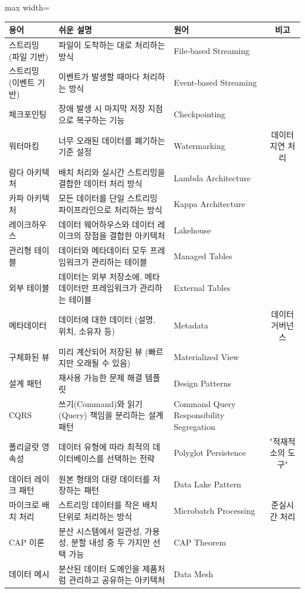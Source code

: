 \documentclass[11pt,a4paper]{article}
\theoremstyle{definition}
\begin{document}
\begin{adjustbox}{max width=\textwidth}
\begin{tabular}{lllc}
\toprule
\textbf{용어} & \textbf{쉬운 설명} & \textbf{원어} & \textbf{비고} \\
\midrule
스트리밍 (파일 기반) & 파일이 도착하는 대로 처리하는 방식 & File-based Streaming & \\
스트리밍 (이벤트 기반) & 이벤트가 발생할 때마다 처리하는 방식 & Event-based Streaming & \\
체크포인팅 & 장애 발생 시 마지막 저장 지점으로 복구하는 기능 & Checkpointing & \\
워터마킹 & 너무 오래된 데이터를 폐기하는 기준 설정 & Watermarking & 데이터 지연 처리 \\
람다 아키텍처 & 배치 처리와 실시간 스트리밍을 결합한 데이터 처리 방식 & Lambda Architecture & \\
카파 아키텍처 & 모든 데이터를 단일 스트리밍 파이프라인으로 처리하는 방식 & Kappa Architecture & \\
레이크하우스 & 데이터 웨어하우스와 데이터 레이크의 장점을 결합한 아키텍처 & Lakehouse & \\
관리형 테이블 & 데이터와 메타데이터 모두 프레임워크가 관리하는 테이블 & Managed Tables & \\
외부 테이블 & 데이터는 외부 저장소에, 메타데이터만 프레임워크가 관리하는 테이블 & External Tables & \\
메타데이터 & 데이터에 대한 데이터 (설명, 위치, 소유자 등) & Metadata & 데이터 거버넌스 \\
구체화된 뷰 & 미리 계산되어 저장된 뷰 (빠르지만 오래될 수 있음) & Materialized View & \\
설계 패턴 & 재사용 가능한 문제 해결 템플릿 & Design Patterns & \\
CQRS & 쓰기(Command)와 읽기(Query) 책임을 분리하는 설계 패턴 & Command Query Responsibility Segregation & \\
폴리글랏 영속성 & 데이터 유형에 따라 최적의 데이터베이스를 선택하는 전략 & Polyglot Persistence & "적재적소의 도구" \\
데이터 레이크 패턴 & 원본 형태의 대량 데이터를 저장하는 패턴 & Data Lake Pattern & \\
마이크로 배치 처리 & 스트리밍 데이터를 작은 배치 단위로 처리하는 방식 & Microbatch Processing & 준실시간 처리 \\
CAP 이론 & 분산 시스템에서 일관성, 가용성, 분할 내성 중 두 가지만 선택 가능 & CAP Theorem & \\
데이터 메시 & 분산된 데이터 도메인을 제품처럼 관리하고 공유하는 아키텍처 & Data Mesh & \\

\end{tabular}
\end{adjustbox}
\end{document}
